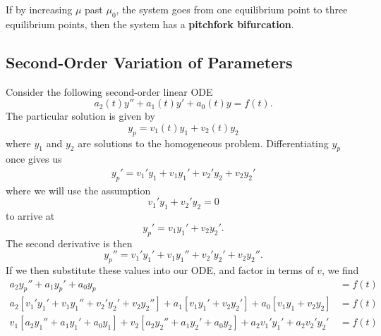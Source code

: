 \documentclass{article}
\begin{document}
If by increasing \(\mu\) past \(\mu_0\), the system goes from one equilibrium point to three equilibrium points,
then the system has a \textbf{pitchfork bifurcation}.
\newpage
\begin{appendix}
    \section*{Second-Order Variation of Parameters}
    Consider the following second-order linear ODE
    \begin{equation*}
        a_2\left( t \right) y'' + a_1\left( t \right) y' + a_0\left( t \right) y = f\left( t \right).
    \end{equation*}
    The particular solution is given by
    \begin{equation*}
        y_p = v_1 \left( t \right) y_1 + v_2\left( t \right) y_2
    \end{equation*}
    where \(y_1\) and \(y_2\) are solutions to the homogeneous problem.
    Differentiating \(y_p\) once gives us
    \begin{align*}
        y_p' = v_1' y_1 + v_1 y_1' + v_2' y_2 + v_2 y_2'
    \end{align*}
    where we will use the assumption
    \begin{equation*}
        v_1' y_1 + v_2' y_2 = 0
    \end{equation*}
    to arrive at
    \begin{equation*}
        y_p' = v_1 y_1' + v_2 y_2'.
    \end{equation*}
    The second derivative is then
    \begin{equation*}
        y_p'' = v_1' y_1' + v_1 y_1'' + v_2' y_2' + v_2 y_2''.
    \end{equation*}
    If we then substitute these values into our ODE, and factor in terms of \(v\), we find
    \begin{align*}
        a_2 y_p'' + a_1 y_p' + a_0 y_p                                                                                                                   & = f\left( t \right) \\
        a_2 \left[ v_1' y_1' + v_1 y_1'' + v_2' y_2' + v_2 y_2'' \right] + a_1 \left[ v_1 y_1' + v_2 y_2' \right] + a_0 \left[ v_1 y_1 + v_2 y_2 \right] & = f\left( t \right) \\
        v_1 \left[ a_2 y_1'' + a_1 y_1' + a_0 y_1 \right] + v_2 \left[ a_2 y_2'' + a_1 y_2' + a_0 y_2 \right] + a_2 v_1' y_1' + a_2 v_2' y_2'            & = f\left( t \right) \\

\end{align*}
\end{appendix}
\end{document}
